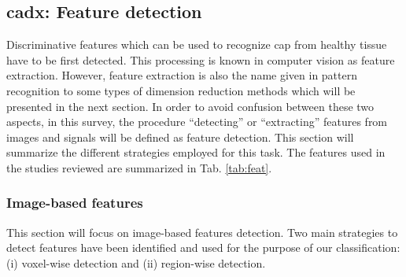 \subsection{\ac{cadx}: Feature detection} \label{subsec:featuredetection}

Discriminative features which can be used to recognize \ac{cap} from healthy tissue have to be first detected. This processing is known in computer vision as feature extraction. However, feature extraction is also the name given in pattern recognition to some types of dimension reduction methods which will be presented in the next section. In order to avoid confusion between these two aspects, in this survey, the procedure ``detecting'' or ``extracting'' features from images and signals will be defined as feature detection. This section will summarize the different strategies employed for this task. The features used in the studies reviewed are summarized in Tab. \ref{tab:feat}.

\subsubsection{Image-based features}

This section will focus on image-based features detection. Two main strategies to detect features have been identified and used for the purpose of our classification: (i) voxel-wise detection and (ii) region-wise detection.

